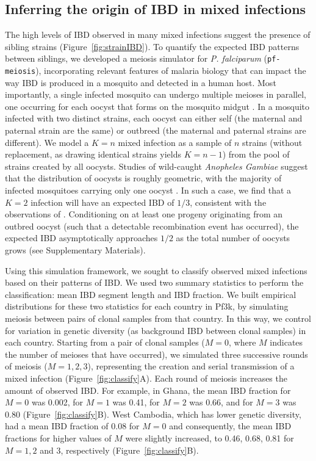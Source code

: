 \documentclass[9pt,lineno]{elife}
\begin{document}
\subsection{Inferring the origin of IBD in mixed infections}

The high levels of IBD observed in many mixed infections suggest the presence of sibling strains (Figure~\ref{fig:strainIBD}). To quantify the expected IBD patterns between siblings, we developed a meiosis simulator for {\it P. falciparum} ({\tt pf-meiosis}), incorporating relevant features of malaria biology that can impact the way IBD is produced in a mosquito and detected in a human host. Most importantly, a single infected mosquito can undergo multiple meioses in parallel, one occurring for each oocyst that forms on the mosquito midgut \citep{Gosh2000}.  In a mosquito infected with two distinct strains, each oocyst can either self (the maternal and paternal strain are the same) or outbreed (the maternal and paternal strains are different). We model a $K = n$ mixed infection as a sample of $n$ strains (without replacement, as drawing identical strains yields $K = n-1$) from the pool of strains created by all oocysts. Studies of wild-caught \textit{Anopheles Gambiae} suggest that the distribution of oocysts is roughly geometric, with the majority of infected mosquitoes carrying only one oocyst \citep{Beir1991,Collins1984}. In such a case, we find that a $K=2$ infection will have an expected IBD of $1/3$, consistent with the observations of \citet{Wong2018}.  Conditioning on at least one progeny originating from an outbred oocyst (such that a detectable recombination event has occurred), the expected IBD asymptotically approaches $1/2$ as the total number of oocysts grows (see Supplementary Materials).

Using this simulation framework, we sought to classify observed mixed infections based on their patterns of IBD. We used two summary statistics to perform the classification: mean IBD segment length and IBD fraction. We built empirical distributions for these two statistics for each country in Pf3k, by simulating meiosis between pairs of clonal samples from that country.  In this way, we control for variation in genetic diversity (as background IBD between clonal samples) in each country. Starting from a pair of clonal samples ($M=0$, where $M$ indicates the number of meioses that have occurred), we simulated three successive rounds of meiosis ($M=1, 2, 3$), representing the creation and serial transmission of a mixed infection (Figure~\ref{fig:classify}A). Each round of meiosis increases the amount of observed IBD. For example, in Ghana, the mean IBD fraction for $M=0$ was 0.002, for $M=1$ was 0.41, for $M=2$ was 0.66, and for $M=3$ was 0.80 (Figure~\ref{fig:classify}B). West Cambodia, which has lower genetic diversity, had a mean IBD fraction of 0.08 for $M=0$ and consequently, the mean IBD fractions for higher values of $M$ were slightly increased, to 0.46, 0.68, 0.81 for $M=1, 2$ and $3$, respectively (Figure~\ref{fig:classify}B).
\end{document}
